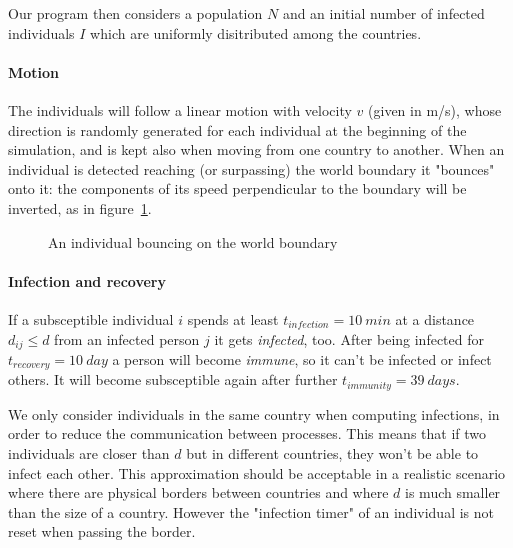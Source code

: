 \noindent
Our program then considers a population $N$ and an initial number of infected individuals $I$ which are uniformly disitributed among the countries. 

\paragraph{Motion}
The individuals will follow a linear motion with velocity $v$ (given in \si{m/s}), whose direction is randomly generated for each individual at the beginning of the simulation, and is kept also when moving from one country to another. When an individual is detected reaching (or surpassing) the world boundary it "bounces" onto it: the components of its speed perpendicular to the boundary will be inverted, as in figure~\ref{fig:boundary_bounce}.

\begin{figure}[h]
    \centering
    \caption{An individual bouncing on the world boundary}
    \label{fig:boundary_bounce}
\end{figure}

\paragraph{Infection and recovery}
If a subsceptible individual $i$ spends at least $t_{infection} = \SI{10}{min}$ at a distance $d_{ij}\leq d$ from an infected person $j$ it gets \emph{infected}, too.
After being infected for $t_{recovery} = \SI{10}{day}$ a person will become \emph{immune}, so it can't be infected or infect others. It will become subsceptible again after further $t_{immunity} = \SI{39}{days}$.

We only consider individuals in the same country when computing infections, in order to reduce the communication between processes. This means that if two individuals are closer than $d$ but in different countries, they won't be able to infect each other. This approximation should be acceptable in a realistic scenario where there are physical borders between countries and where $d$ is much smaller than the size of a country. However the "infection timer" of an individual is not reset when passing the border.

